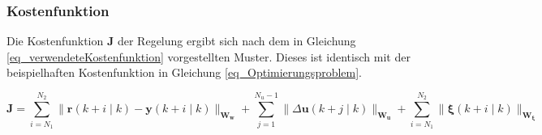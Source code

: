 \subsubsection*{Kostenfunktion} \label{subsubsec_Kostenfunktion}
Die Kostenfunktion $\boldsymbol{J}$ der Regelung ergibt sich nach dem in Gleichung \ref{eq_verwendeteKostenfunktion} vorgestellten Muster.
Dieses ist identisch mit der beispielhaften Kostenfunktion in Gleichung \ref{eq_Optimierungsproblem}.

\vspace*{-1\baselineskip}
\begin{equation} \label{eq_verwendeteKostenfunktion}
    \boldsymbol{J} =  \sum_{i=N_1}^{N_2}\|\boldsymbol{r}(k+i \mid k)-\boldsymbol{y}(k+i \mid k)\|_{\boldsymbol{W_w}}+\sum_{j=1}^{N_u-1}\|\Delta \boldsymbol{u}(k+j \mid k)\|_{\boldsymbol{W_u}}+\sum_{i=N_1}^{N_2}\|\boldsymbol{\xi}(k+i \mid k)\|_{\boldsymbol{W_{\xi}}} \qquad
\end{equation}

